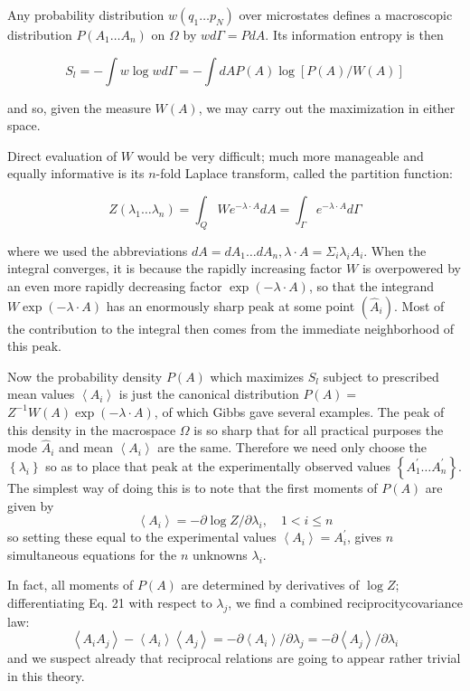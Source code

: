 \documentclass{article}
\begin{document}
Any probability distribution $w\left(q_1 \ldots p_N\right)$ over microstates defines a macroscopic distribution $P\left(A_1 \ldots A_n\right)$ on $\Omega$ by $w d \Gamma=P d A$. Its information entropy is then

$$
S_l=-\int w \log w d \Gamma=-\int d A P(A) \log [P(A) / W(A)]
$$

and so, given the measure $W(A)$, we may carry out the maximization in either space.

Direct evaluation of $W$ would be very difficult; much more manageable and equally informative is its $n$-fold Laplace transform, called the partition function:

$$
Z\left(\lambda_1 \ldots \lambda_n\right)=\int_Q W e^{-\lambda \cdot A} d A=\int_{\Gamma} e^{-\lambda \cdot A} d \Gamma
$$

where we used the abbreviations $d A=d A_1 \ldots d A_n, \lambda \cdot A=\Sigma_i \lambda_i A_i$. When the integral converges, it is because the rapidly increasing factor $W$ is overpowered by an even more rapidly decreasing factor $\exp (-\lambda \cdot A)$, so that the integrand $W \exp (-\lambda \cdot A)$ has an enormously sharp peak at some point $\left(\hat{A}_i\right)$. Most of the contribution to the integral then comes from the immediate neighborhood of this peak.

Now the probability density $P(A)$ which maximizes $S_l$ subject to prescribed mean values $\left\langle A_i\right\rangle$ is just the canonical distribution $P(A)=$ $Z^{-1} W(A) \exp (-\lambda \cdot A)$, of which Gibbs gave several examples. The peak of this density in the macrospace $\Omega$ is so sharp that for all practical purposes the mode $\hat{A}_i$ and mean $\left\langle A_i\right\rangle$ are the same. Therefore we need only choose the $\left\{\lambda_i\right\}$ so as to place that peak at the experimentally observed values $\left\{A_1^{\prime} \ldots A_n^{\prime}\right\}$. The simplest way of doing this is to note that the first moments of $P(A)$ are given by
$$
\left\langle A_i\right\rangle=-\partial \log Z / \partial \lambda_i, \quad 1<i \leqslant n
$$
so setting these equal to the experimental values $\left\langle A_i\right\rangle=A_i^{\prime}$, gives $n$ simultaneous equations for the $n$ unknowns $\lambda_i$.

In fact, all moments of $P(A)$ are determined by derivatives of $\log Z$; differentiating Eq. 21 with respect to $\lambda_j$, we find a combined reciprocitycovariance law:
$$
\left\langle A_i A_j\right\rangle-\left\langle A_i\right\rangle\left\langle A_j\right\rangle=-\partial\left\langle A_i\right\rangle / \partial \lambda_j=-\partial\left\langle A_j\right\rangle / \partial \lambda_i
$$
and we suspect already that reciprocal relations are going to appear rather trivial in this theory.
\end{document}
